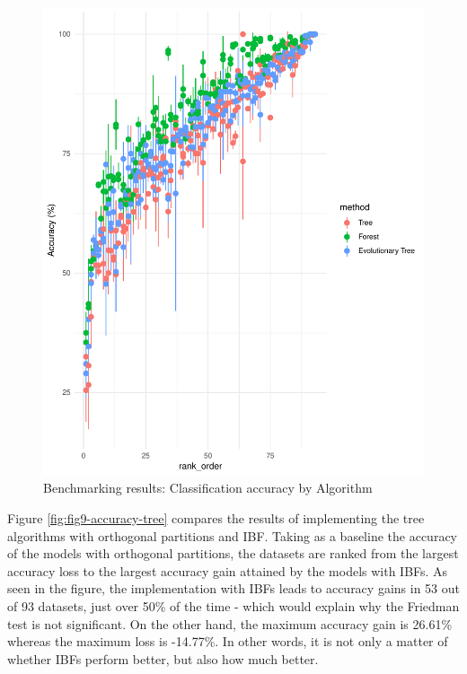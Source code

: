 \documentclass[]{elsarticle} %
\makeatletter
\def\maxwidth{\ifdim\Gin@nat@width>\linewidth\linewidth
\else\Gin@nat@width\fi}
\let\Oldincludegraphics\includegraphics
\renewcommand{\includegraphics}[1]{\Oldincludegraphics[width=\maxwidth]{#1}}
\makeatother
\begin{document}
\begin{figure}
\centering
\includegraphics{Trees_with_Base_Functions_v3_files/figure-latex/fig8-performance-algorithm-results-1.pdf}
\caption{\label{fig:fig8-performance-algorithm-results}Benchmarking
results: Classification accuracy by Algorithm}
\end{figure}

Figure \ref{fig:fig9-accuracy-tree} compares the results of implementing
the tree algorithms with orthogonal partitions and IBF. Taking as a
baseline the accuracy of the models with orthogonal partitions, the
datasets are ranked from the largest accuracy loss to the largest
accuracy gain attained by the models with IBFs. As seen in the figure,
the implementation with IBFs leads to accuracy gains in 53 out of 93
datasets, just over 50\% of the time - which would explain why the
Friedman test is not significant. On the other hand, the maximum
accuracy gain is 26.61\% whereas the maximum loss is -14.77\%. In other
words, it is not only a matter of whether IBFs perform better, but also
how much better.
\end{document}
